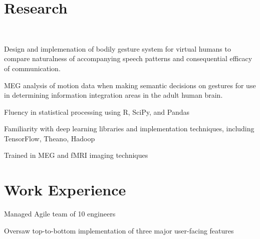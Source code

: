\documentclass[]{csaund_resume-openfont}
\begin{document}
\begin{minipage}[t]{0.66\textwidth}



\section{Research}
 \\
\vspace{\topsep} %
\begin{tightemize}
\item Design and implemenation of bodily gesture system for virtual humans to compare naturalness of accompanying speech patterns and consequential efficacy of communication.
\item MEG analysis of motion data when making semantic decisions on gestures for use in determining information integration areas in the adult human brain.
\end{tightemize}
\sectionsep
{}
\location{}
\begin{tightemize}
\item Fluency in statistical processing using R, SciPy, and Pandas
\item Familiarity with deep learning libraries and implementation techniques, including TensorFlow, Theano, Hadoop
\item Trained in MEG and fMRI imaging techniques
\end{tightemize}
\sectionsep


\section{Work Experience}

\begin{tightemize}
\item Managed Agile team of 10 engineers 
\item Oversaw top-to-bottom implementation of three major user-facing features
\end{tightemize}


\end{minipage}
\end{document}
